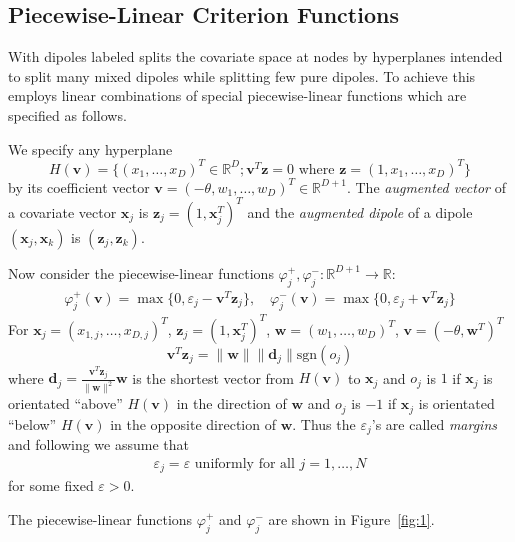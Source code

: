 \documentclass[sn-mathphys]{sn-jnl}%
\theoremstyle{thmstyleone}%
\theoremstyle{thmstyletwo}%
\theoremstyle{thmstylethree}%
\newcommand{\RR}{\mathbb{R}}
\newcommand{\eps}{\varepsilon}
\begin{document}
\subsection{Piecewise-Linear Criterion Functions} \label{sec:PLCF}


With dipoles labeled \cite{kretowska} splits the covariate space at nodes by hyperplanes intended to split many mixed dipoles while splitting few pure dipoles. To achieve this \cite{kretowska} employs linear combinations of special piecewise-linear functions which are specified as follows.

We specify any hyperplane
\[
H(\mathbf{v}) = \big\{(x_1,\ldots,x_D)^T \in \RR^D ; \mathbf{v}^T\mathbf{z} = 0 \text{ where } \mathbf{z} = (1, x_1,\ldots,x_D)^T \big\}
\]
by its coefficient vector $\mathbf{v} = (-\theta, w_1, \ldots, w_D)^T \in \RR^{D + 1}$. The\textit{ augmented vector }of a covariate vector $\mathbf{x}_j$ is $\mathbf{z}_j = (1, \mathbf{x}_j^T)^T$ and the\textit{ augmented dipole} of a dipole $(\mathbf{x}_j, \mathbf{x}_k)$ is $(\mathbf{z}_j, \mathbf{z}_k)$.

Now consider the piecewise-linear functions $\varphi^+_j, \varphi^-_j : \RR^{D + 1} \to \RR$:
	\begin{align}
		\varphi^+_j(\mathbf{v}) = \max\{0, \eps_j - \mathbf{v}^T \mathbf{z}_j\}, \quad
		\varphi^-_j(\mathbf{v}) = \max\{0, \eps_j + \mathbf{v}^T \mathbf{z}_j\} \label{eqs:PLC}
	\end{align} For $\mathbf{x}_j=(x_{1, j},\ldots,x_{D, j} )^T$, $\mathbf{z}_j =  (1, \mathbf{x}_j^T)^T$, $\mathbf{w} = (w_1, \ldots, w_D)^T$, $\mathbf{v} = (-\theta, \mathbf{w}^T)^T$
\[
 \mathbf{v}^T \mathbf{z}_j = \lVert \mathbf{w} \rVert \lVert \mathbf{d}_j \rVert \text{sgn}(o_j)
  \]
  where $\mathbf{d}_j = \frac{\mathbf{v}^T \mathbf{z}_j}{\lVert \mathbf{w} \rVert^2} \mathbf{w}$ is the shortest vector from $H(\mathbf{v})$ to $\mathbf{x}_j$ and $o_j$ is $1$ if $\mathbf{x}_j$ is orientated ``above''  $H(\mathbf{v})$ in the direction of $\mathbf{w}$ and $o_j$ is $-1$ if  $\mathbf{x}_j$ is orientated ``below''  $H(\mathbf{v})$ in the opposite direction of $\mathbf{w}$. Thus the $\eps_j$'s are called \textit{margins} and following \cite{bobrowskikretowski} we assume that
	\begin{align}
	\eps_j = \eps \text{ uniformly for all } j = 1, \ldots, N \label{eqs:uniformmargins}
	\end{align} for some fixed $\eps > 0$.


The piecewise-linear functions $\varphi^+_j$ and $\varphi^-_j$ are shown in Figure~\ref{fig:1}.
\end{document}
